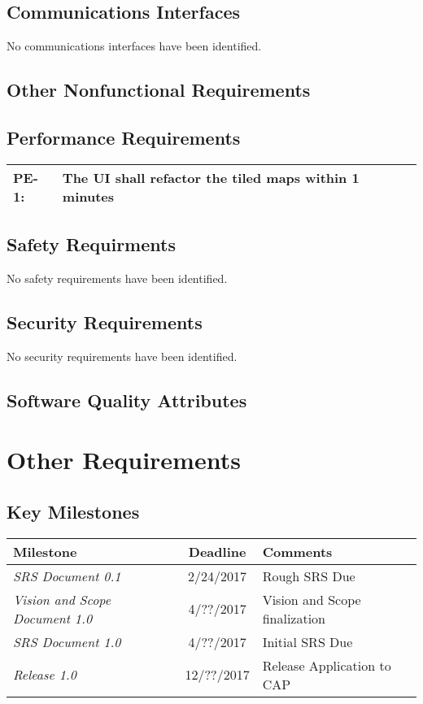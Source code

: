 \documentclass[12pt, letterpaper]{article}
\begin{document}
  \subsection{Communications Interfaces}
  No communications interfaces have been identified.

\subsection{Other Nonfunctional Requirements}
  \subsection{Performance Requirements}
    \begin{tabularx}{\textwidth}{|l|X|}
      \hline
      PE-1: & The UI shall refactor the tiled maps within 1 minutes\\ \hline
    \end{tabularx}

  \subsection{Safety Requirments}
  No safety requirements have been identified.
  \subsection{Security Requirements}
  No security requirements have been identified.
  \subsection{Software Quality Attributes}

\section{Other Requirements}
  \subsection{Key Milestones}
  \begin{tabularx}{\textwidth}{l c l}
    \hline
    \textbf{Milestone} & \textbf{Deadline} & \textbf{Comments}\\
    \hline
    \textit{SRS Document 0.1} & 2/24/2017 & Rough SRS Due \\
    \textit{Vision and Scope Document 1.0} & 4/??/2017 & Vision and Scope finalization \\
    \textit{SRS Document 1.0} & 4/??/2017 & Initial SRS Due \\
    \textit{Release 1.0} & 12/??/2017 & Release Application to CAP \\
    \hline
  \end{tabularx}
\appendix
\end{document}
